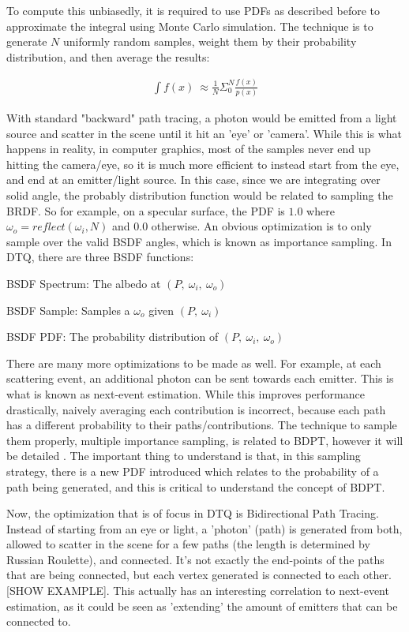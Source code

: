 \documentclass{article}
\begin{document}
  To compute this unbiasedly, it is required to use PDFs as described before to
approximate the integral using Monte Carlo simulation. The technique is to
generate $N$ uniformly random samples, weight them by their probability
distribution, and then average the results:
  
  \begin{align}
   \int{f(x)} \: \approx \frac{1}{N}\Sigma_0^N{\frac{f(x)}{p(x)}}
  \end{align}
  
  With standard "backward" path tracing, a photon would be emitted from a light
source and scatter in the scene until it hit an 'eye' or 'camera'. While this is
what happens in reality, in computer graphics, most of the samples never end up
hitting the camera/eye, so it is much more efficient to instead start from the
eye, and end at an emitter/light source. In this case, since we are integrating
over solid angle, the probably distribution function would be related to
sampling the BRDF. So for example, on a specular surface, the PDF is $1.0$ where
$\omega_o = reflect(\omega_i, N)$ and $0.0$ otherwise. An obvious optimization
is to only sample over the valid BSDF angles, which is known as importance
sampling. In DTQ, there are three BSDF functions:
  
  \begin{list}{}{}
  \item BSDF Spectrum: The albedo at $(P,\:\omega_i,\:\omega_o)$
  \item BSDF Sample: Samples a $\omega_o$ given $(P,\:\omega_i)$
  \item BSDF PDF: The probability distribution of $(P,\:\omega_i,\:\omega_o)$
  \end{list}
  
  There are many more optimizations to be made as well. For example, at each
scattering event, an additional photon can be sent towards each emitter. This is
what is known as next-event estimation. While this improves performance
drastically, naively averaging each contribution is incorrect, because each path
has a different probability to their paths/contributions. The technique to
sample them properly, multiple importance sampling, is related to BDPT, however
it will be detailed . The important thing to understand is that, in this
sampling strategy, there is a new PDF introduced which relates to the
probability of a path being generated, and this is critical to understand the
concept of BDPT.
  
  Now, the optimization that is of focus in DTQ is Bidirectional Path Tracing.
Instead of starting from an eye or light, a 'photon' (path) is generated from
both, allowed to scatter in the scene for a few paths (the length is determined
by Russian Roulette), and connected. It's not exactly the end-points of the
paths that are being connected, but each vertex generated is connected to each
other. [SHOW EXAMPLE]. This actually has an interesting correlation to
next-event estimation, as it could be seen as 'extending' the amount of emitters
that can be connected to.
  
\end{document}

